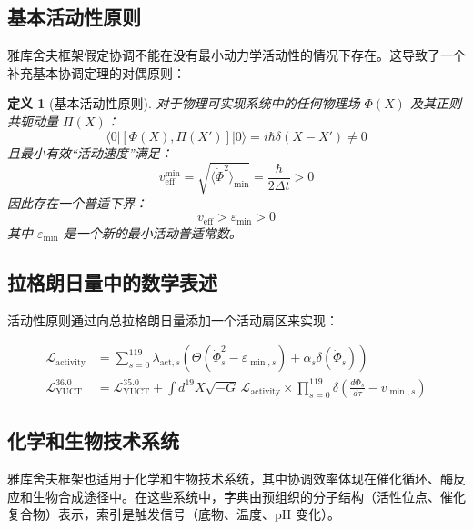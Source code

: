 \documentclass[11pt,a4paper]{article}
\newtheorem{definition}{定义}
\begin{document}
	\subsection{基本活动性原则}
	
	雅库舍夫框架假定协调不能在没有最小动力学活动性的情况下存在。这导致了一个补充基本协调定理的对偶原则：
	
	\begin{definition}[基本活动性原则]
		对于物理可实现系统中的任何物理场 $\Phi(X)$ 及其正则共轭动量 $\Pi(X)$：
		\[
		\langle 0 | [\Phi(X), \Pi(X')] | 0 \rangle = i\hbar\delta(X-X') \neq 0
		\]
		且最小有效“活动速度”满足：
		\[
		v_{\mathrm{eff}}^{\min} = \sqrt{\langle \dot{\Phi}^2 \rangle_{\min}} = \frac{\hbar}{2\Delta t} > 0
		\]
		因此存在一个普适下界：
		\[
		\boxed{v_{\mathrm{eff}} > \varepsilon_{\min} > 0}
		\]
		其中 $\varepsilon_{\min}$ 是一个新的最小活动普适常数。
	\end{definition}
	
	\subsection{拉格朗日量中的数学表述}
	
	活动性原则通过向总拉格朗日量添加一个活动扇区来实现：
	
	\begin{align}
		\mathcal{L}_{\mathrm{activity}} &= \sum_{s=0}^{119} \lambda_{\mathrm{act},s} \left( \Theta(\dot{\Phi}_s^2 - \varepsilon_{\min,s}) + \alpha_s \delta(\dot{\Phi}_s) \right) \\
		\mathcal{L}_{\mathrm{YUCT}}^{36.0} &= \mathcal{L}_{\mathrm{YUCT}}^{35.0} + \int d^{19}X \sqrt{-G} \, \mathcal{L}_{\mathrm{activity}} \times \prod_{s=0}^{119} \delta\left( \frac{d\Phi_s}{d\tau} - v_{\min,s} \right)
	\end{align}
	
	\subsection{化学和生物技术系统}
	\label{subsec:chemical-systems}
	
	雅库舍夫框架也适用于化学和生物技术系统，其中协调效率体现在催化循环、酶反应和生物合成途径中。在这些系统中，字典由预组织的分子结构（活性位点、催化复合物）表示，索引是触发信号（底物、温度、pH 变化）。
	
\end{document}
